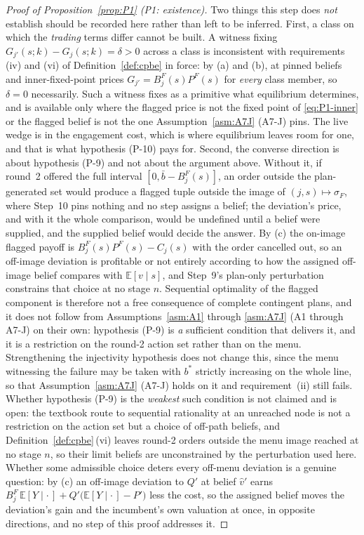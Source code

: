 \documentclass[11pt]{article}
\newcommand{\Eop}{\mathbb{E}}
\begin{document}
\begin{proof}[Proof of Proposition~\ref{prop:P1} (P1: existence)]
Two things this step does \emph{not} establish should be recorded here rather than left to be
inferred. First, a class on which the \emph{trading} terms differ cannot be built. A witness fixing
$G_{j'}(s;k) - G_j(s;k) = \delta > 0$ across a class is inconsistent with requirements (iv) and (vi)
of Definition~\ref{def:cpbe} in force: by (a) and (b), at pinned beliefs and inner-fixed-point prices
$G_{j'} = B_j^F(s)P^F(s)$ for \emph{every} class member, so $\delta = 0$ necessarily. Such a witness
fixes as a primitive what equilibrium determines, and is available only where the flagged price is
not the fixed point of \eqref{eq:P1-inner} or the flagged belief is not the one
Assumption~\ref{asm:A7J} (A7-J) pins. The live wedge is in the engagement cost, which is where equilibrium
leaves room for one, and that is what hypothesis (P-10) pays for. Second, the converse direction is
about hypothesis (P-9) and not about the argument above. Without it, if round~2 offered the full
interval $[0,\bar b-B_j^F(s)]$, an order outside the plan-generated set would produce a flagged
tuple outside the image of $(j,s) \mapsto \sigma_F$, where Step~10 pins nothing and no step assigns a
belief; the deviation's price, and with it the whole comparison, would be undefined until a belief
were supplied, and the supplied belief would decide the answer. By (c) the on-image flagged payoff is
$B_j^F(s)P^F(s)-C_j(s)$ with the order cancelled out, so an off-image deviation is profitable or not
entirely according to how the assigned off-image belief compares with $\Eop[v \mid s]$, and Step~9's
plan-only perturbation constrains that choice at no stage $n$. Sequential optimality of the flagged
component is therefore not a free consequence of complete contingent plans, and it does not follow
from Assumptions~\ref{asm:A1} through \ref{asm:A7J} (A1 through A7-J) on their own: hypothesis (P-9) is \emph{a} sufficient
condition that delivers it, and it is a restriction on the round-2 action set rather than on the
menu. Strengthening the injectivity hypothesis does not change this, since the menu witnessing the
failure may be taken with $b^*$ strictly increasing on the whole line, so that
Assumption~\ref{asm:A7J} (A7-J) holds on it and requirement~(ii) still fails. Whether hypothesis (P-9) is
the \emph{weakest} such condition is not claimed and is open: the textbook route to sequential
rationality at an unreached node is not a restriction on the action set but a choice of off-path
beliefs, and Definition~\ref{def:cpbe}\,(vi) leaves round-2 orders outside the menu image reached at
no stage $n$, so their limit beliefs are unconstrained by the perturbation used here. Whether some
admissible choice deters every off-menu deviation is a genuine question: by (c) an off-image
deviation to $Q'$ at belief $\hat v'$ earns
$B_j^F\,\Eop[Y \mid \cdot\,] + Q'\bigl(\Eop[Y \mid \cdot\,]-P'\bigr)$ less the cost, so the assigned
belief moves the deviation's gain and the incumbent's own valuation at once, in opposite directions,
and no step of this proof addresses it.


\end{proof}
\end{document}
